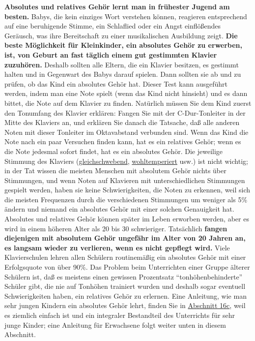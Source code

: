 \textbf{Absolutes und relatives Gehör lernt man in frühester Jugend am besten.}
Babys, die kein einziges Wort verstehen können, reagieren entsprechend auf eine beruhigende Stimme, ein Schlaflied oder ein Angst einflößendes Geräusch, was ihre Bereitschaft zu einer musikalischen Ausbildung zeigt.
\textbf{Die beste Möglichkeit für Kleinkinder, ein absolutes Gehör zu erwerben, ist, von Geburt an fast täglich einem gut gestimmten Klavier zuzuhören.}
Deshalb sollten alle Eltern, die ein Klavier besitzen, es gestimmt halten und in Gegenwart des Babys darauf spielen.
Dann sollten sie ab und zu prüfen, ob das Kind ein absolutes Gehör hat.
Dieser Test kann ausgeführt werden, indem man eine Note spielt (wenn das Kind nicht hinsieht) und es dann bittet, die Note auf dem Klavier zu finden.
Natürlich müssen Sie dem Kind zuerst den Tonumfang des Klavier erklären: Fangen Sie mit der C-Dur-Tonleiter in der Mitte des Klaviers an, und erklären Sie danach die Tatsache, daß alle anderen Noten mit dieser Tonleiter im Oktavabstand verbunden sind.
Wenn das Kind die Note nach ein paar Versuchen finden kann, hat es ein relatives Gehör; wenn es die Note jedesmal sofort findet, hat es ein absolutes Gehör.
Die jeweilige Stimmung des Klaviers (\hyperlink{c2_6_et}{gleichschwebend}, \hyperlink{c2_2_wtk2}{wohltemperiert} usw.) ist nicht wichtig; in der Tat wissen die meisten Menschen mit absolutem Gehör nichts über Stimmungen, und wenn Noten auf Klavieren mit unterschiedlichen Stimmungen gespielt werden, haben sie keine Schwierigkeiten, die Noten zu erkennen, weil sich die meisten Frequenzen durch die verschiedenen Stimmungen um weniger als 5\% ändern und niemand ein absolutes Gehör mit einer solchen Genauigkeit hat.
Absolutes und relatives Gehör können später im Leben erworben werden, aber es wird in einem höheren Alter als 20 bis 30 schwieriger.
Tatsächlich \textbf{fangen diejenigen mit absolutem Gehör ungefähr im Alter von 20 Jahren an, es langsam wieder zu verlieren, wenn es nicht gepflegt wird.}
Viele Klavierschulen lehren allen Schülern routinemäßig ein absolutes Gehör mit einer Erfolgsquote von über 90\%.
Das Problem beim Unterrichten einer Gruppe älterer Schülern ist, daß es meistens einen gewissen Prozentsatz \enquote{tonhöhenbehinderte} Schüler gibt, die nie auf Tonhöhen trainiert wurden und deshalb sogar eventuell Schwierigkeiten haben, ein relatives Gehör zu erlernen.
Eine Anleitung, wie man sehr jungen Kindern ein absolutes Gehör lehrt, finden Sie in \hyperlink{c1iii16c}{Abschnitt 16c}, weil es ziemlich einfach ist und ein integraler Bestandteil des Unterrichts für sehr junge Kinder; eine Anleitung für Erwachsene folgt weiter unten in diesem Abschnitt.


